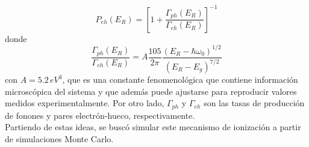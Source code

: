\begin{equation}
    P_{eh}(E_{R}) = 
    \left[
        1 + \frac{\Gamma_{ph}(E_{R})}{\Gamma_{eh}(E_{R})}
    \right]^{-1}
        \label{ec:ProbabilidadIonizacion}
\end{equation}
donde 
\begin{equation*}
    \frac{\Gamma_{ph}(E_{R})}{\Gamma_{eh}(E_{R})}
    = A\frac{105}{2\pi}\frac{(E_{R} - \hbar \omega_{0})^{1/2}}{(E_{R} - E_{g})^{7/2}}
\end{equation*}
con $A = 5.2\,eV^{3}$, que es una constante fenomenológica que contiene información microscópica del sistema y que además puede ajustarse para reproducir valores medidos experimentalmente. Por otro lado, $\Gamma_{ph}$ y $\Gamma_{eh}$ son las tasas de producción de fonones y pares electrón-hueco, respectivamente.\\
\indent Partiendo de estas ideas, se buscó simular este mecanismo de ionización a partir de simulaciones Monte Carlo.

